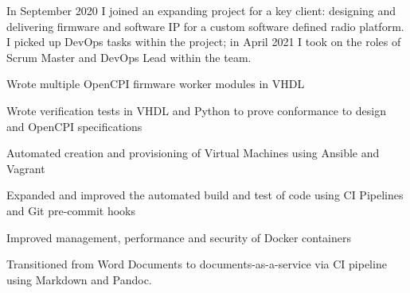 \sectionsep
{}
  \vspace{0.5em}
  In September 2020 I joined an expanding project for a key client: designing and delivering firmware and software IP for a custom software defined radio platform. I picked up DevOps tasks within the project; in April 2021 I took on the roles of Scrum Master and DevOps Lead within the team.
\vspace{0.25em}
\begin{tightemize}
    \item Wrote multiple OpenCPI firmware worker modules in VHDL
    \item Wrote verification tests in VHDL and Python to prove conformance to design and OpenCPI specifications
    \item Automated creation and provisioning of Virtual Machines using Ansible and Vagrant
    \item Expanded and improved the automated build and test of code using CI Pipelines and Git pre-commit hooks
    \item Improved management, performance and security of Docker containers
    \item Transitioned from Word Documents to documents-as-a-service via CI pipeline using Markdown and Pandoc.
\end{tightemize}
\sectionsep
